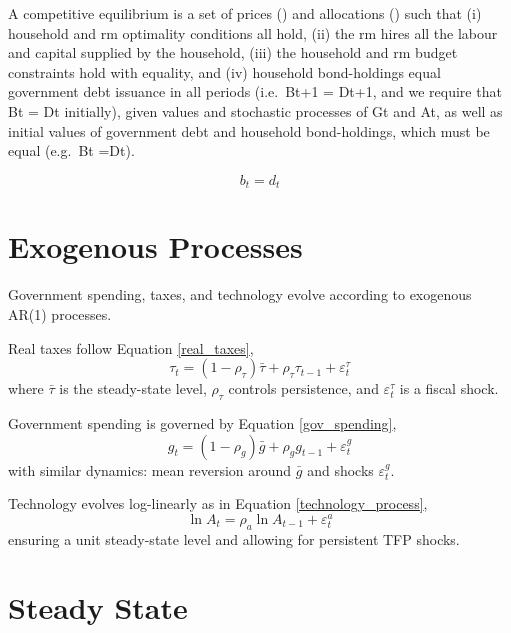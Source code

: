 \documentclass[11pt,preprint]{elsarticle}
\numberwithin{equation}{section}
\numberwithin{figure}{section}
\numberwithin{table}{section}
\begin{document}
A competitive equilibrium is a set of prices () and allocations () such
that (i) household and rm optimality conditions all hold, (ii) the rm
hires all the labour and capital supplied by the household, (iii) the
household and rm budget constraints hold with equality, and (iv)
household bond-holdings equal government debt issuance in all periods
(i.e.~Bt+1 = Dt+1, and we require that Bt = Dt initially), given values
and stochastic processes of Gt and At, as well as initial values of
government debt and household bond-holdings, which must be equal
(e.g.~Bt =Dt).

\begin{equation}
b_t = d_t
\label{Bond_market_clear}
\end{equation}

\section{Exogenous Processes}\label{exogenous-processes}

Government spending, taxes, and technology evolve according to exogenous
AR(1) processes.

Real taxes follow Equation \eqref{real_taxes}, \begin{equation}
\tau_t = (1-\rho_\tau)\bar{\tau} + \rho_\tau \tau_{t-1} + \varepsilon_t^\tau 
\label{real_taxes}
\end{equation} where \(\bar{\tau}\) is the steady-state level,
\(\rho_\tau\) controls persistence, and \(\varepsilon_t^\tau\) is a
fiscal shock.

Government spending is governed by Equation \eqref{gov_spending},
\begin{equation}
g_t = (1-\rho_g)\bar{g} + \rho_g g_{t-1} + \varepsilon_t^g 
\label{gov_spending}
\end{equation} with similar dynamics: mean reversion around \(\bar{g}\)
and shocks \(\varepsilon_t^g\).

Technology evolves log-linearly as in Equation
\eqref{technology_process}, \begin{equation}
\ln A_t = \rho_a \ln A_{t-1} + \varepsilon_t^a 
\label{technology_process}
\end{equation} ensuring a unit steady-state level and allowing for
persistent TFP shocks.

\section{Steady State}\label{steady-state}
\end{document}
